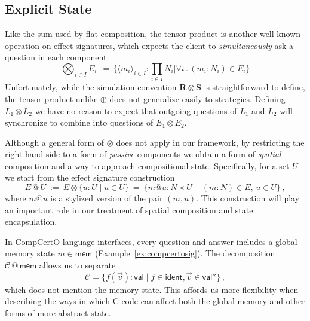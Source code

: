 \documentclass[acmsmall,nonacm]{acmart}
\newcommand{\kw}[1]{\ensuremath{ \mathsf{#1} }}
\begin{document}

\subsection{Explicit State} %

Like the sum used by flat composition,
the tensor product is another well-known operation on effect signatures,
which expects the client to
\emph{simultaneously} ask a question in each component:
\[
  \bigotimes_{i \in I} E_i \, := \,
    \textstyle
    \big\{ \langle m_i \rangle_{i\in I} : \prod_{i \in I} N_i \mathrel{\big|}
       \forall i \mathbin. (m_i \mathbin: N_i) \in E_i \big\}
\]
Unfortunately,
while the simulation convention $\mathbf{R} \otimes \mathbf{S}$
is straightforward to define,
the tensor product unlike $\oplus$ does not generalize easily to strategies.
Defining
$L_1 \otimes L_2$ %
we have no reason to expect that
outgoing questions of $L_1$ and $L_2$
will synchronize to combine
into questions of $E_1 \otimes E_2$.

Although a general form of $\otimes$
does not apply in our framework,
by restricting the right-hand side
to a form of \emph{passive} components
we obtain a form of \emph{spatial} composition
and a way to approach compositional state.
Specifically,
for a set $U$
we start from the effect signature construction
\[
  E \mathbin@ U \::=\: E \otimes \{ u : U \mid u \in U \} \:=\:
    \{ m @ u : N \times U \,\mid\, (m \mathbin: N) \in E, \, u \in U \}
   \,,
\]
where $m @ u$ is a stylized version of the pair $(m, u)$.
This construction will play an important role
in our treatment of spatial composition and state encapsulation.

\begin{example} %
In CompCertO language interfaces,
every question and answer includes a global memory state $m \in \kw{mem}$ (Example~\ref{ex:compcertosig}).
The decomposition $\mathcal{C} \mathbin@ \kw{mem}$ allows us to separate
\[
  \mathcal{C} = \{ f(\vec{v}) \mathbin: \kw{val} \mid
      f \in \kw{ident}, \vec{v} \in \kw{val}* \}
  \,,
\]
which does not mention the memory state.
This affords us more flexibility
when describing the ways in which C code
can affect both the global memory
and other forms of more abstract state.
\end{example}
\end{document}

